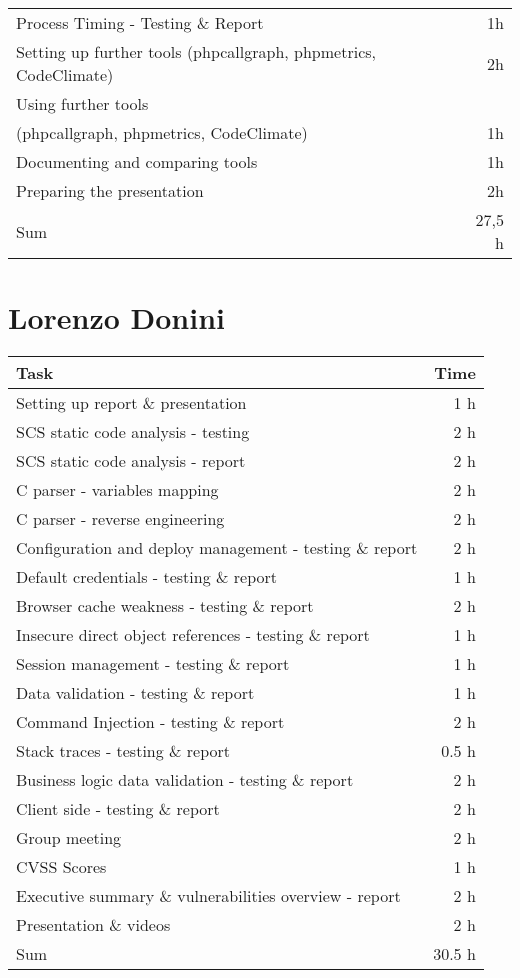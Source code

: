 \begin{table}[h!tpb]
\begin{tabularx}{\textwidth}{X r}
    Process Timing - Testing \& Report & 1h \\
    Setting up further tools (phpcallgraph, phpmetrics, CodeClimate) & 2h \\
    Using further tools\\(phpcallgraph, phpmetrics, CodeClimate) & 1h \\
    Documenting and comparing tools & 1h \\
    Preparing the presentation & 2h \\
    \midrule
      Sum & 27,5 h \\    
    \bottomrule
  \end{tabularx}
\end{table}

\clearpage
\section*{Lorenzo Donini}
\begin{table}[h!tpb]
  \centering
  \begin{tabularx}{\textwidth}{X r}
    \toprule
      Task & Time \\
    \midrule
      Setting up report \& presentation & 1 h \\
      SCS static code analysis - testing & 2 h \\
      SCS static code analysis - report & 2 h \\
      C parser - variables mapping & 2 h \\
      C parser - reverse engineering & 2 h \\
      Configuration and deploy management - testing \& report & 2 h \\
      Default credentials - testing \& report & 1 h \\
      Browser cache weakness - testing \& report & 2 h \\
      Insecure direct object references - testing \& report & 1 h \\
      Session management - testing \& report & 1 h \\
      Data validation - testing \& report & 1 h \\
      Command Injection - testing \& report & 2 h \\
      Stack traces - testing \& report & 0.5 h \\
      Business logic data validation - testing \& report & 2 h \\
      Client side - testing \& report & 2 h \\
      Group meeting & 2 h \\
      CVSS Scores & 1 h \\
      Executive summary \& vulnerabilities overview - report & 2 h \\
      Presentation \& videos & 2 h \\
    \midrule
      Sum & 30.5 h \\
    \bottomrule
  \end{tabularx}
\end{table}

